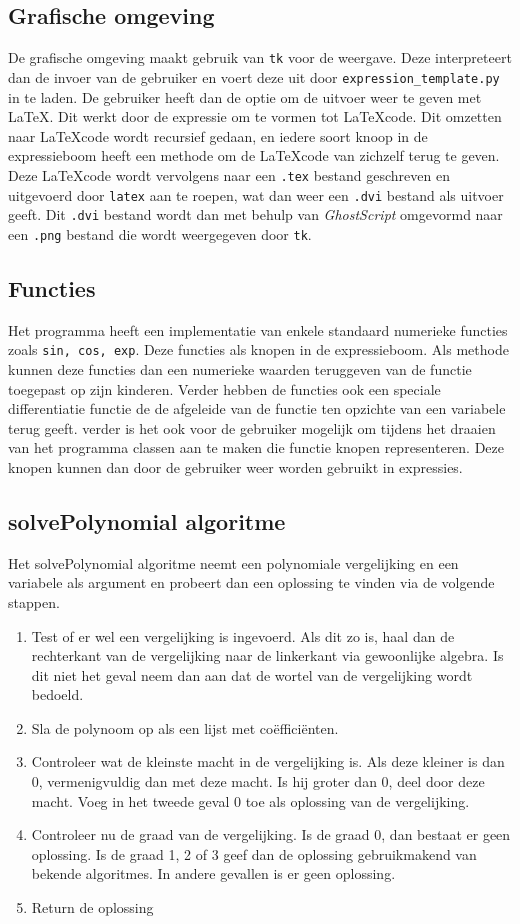 \documentclass[a4paper]{article}
\newcommand{\ttt}[1]{\texttt{#1}}
\begin{document}
\subsection{Grafische omgeving}
De grafische omgeving maakt gebruik van  \ttt{tk} voor de weergave. Deze interpreteert dan de invoer van de gebruiker en voert deze uit door \ttt{expression\_template.py} in te laden. De gebruiker heeft dan de optie om de uitvoer weer te geven met \LaTeX. Dit werkt door de expressie om te vormen tot \LaTeX code. Dit omzetten naar \LaTeX code wordt recursief gedaan, en iedere soort knoop in de expressieboom heeft een methode om de \LaTeX code van zichzelf terug te geven. Deze \LaTeX code wordt vervolgens naar een \ttt{.tex} bestand geschreven en uitgevoerd door \ttt{latex} aan te roepen, wat dan weer een \ttt{.dvi} bestand als uitvoer geeft. Dit \ttt{.dvi} bestand wordt dan met behulp van \textit{GhostScript} omgevormd naar een \ttt{.png} bestand die wordt weergegeven door \ttt{tk}. 

\subsection{Functies}
Het programma heeft een implementatie van enkele standaard numerieke functies zoals \ttt{sin, cos, exp}. Deze functies als knopen in de expressieboom. Als methode kunnen deze functies dan een numerieke waarden teruggeven van de functie toegepast op zijn kinderen. Verder hebben de functies ook een speciale differentiatie functie de de afgeleide van de functie ten opzichte van een variabele terug geeft. verder is het ook voor de gebruiker mogelijk om tijdens het draaien van het programma classen aan te maken die functie knopen representeren. Deze knopen kunnen dan door de gebruiker weer worden gebruikt in expressies.  


\subsection{solvePolynomial algoritme}
Het solvePolynomial algoritme neemt een polynomiale vergelijking en een variabele als argument en probeert dan een oplossing te vinden via de volgende stappen.
\begin{enumerate}
\item Test of er wel een vergelijking is ingevoerd. Als dit zo is, haal dan de rechterkant van de vergelijking naar de linkerkant via gewoonlijke algebra. Is dit niet het geval neem dan aan dat de wortel van de vergelijking wordt bedoeld.
\item Sla de polynoom op als een lijst met co\"effici\"enten. 
\item Controleer wat de kleinste macht in de vergelijking is. Als deze kleiner is dan 0, vermenigvuldig dan met deze macht. Is hij groter dan 0, deel door deze macht. Voeg in het tweede geval 0 toe als oplossing van de vergelijking.
\item Controleer nu de graad van de vergelijking. Is de graad 0, dan bestaat er geen oplossing. Is de graad 1, 2 of 3 geef dan de oplossing gebruikmakend van bekende algoritmes. In andere gevallen is er geen oplossing.
\item Return de oplossing
\end{enumerate}
\end{document}
